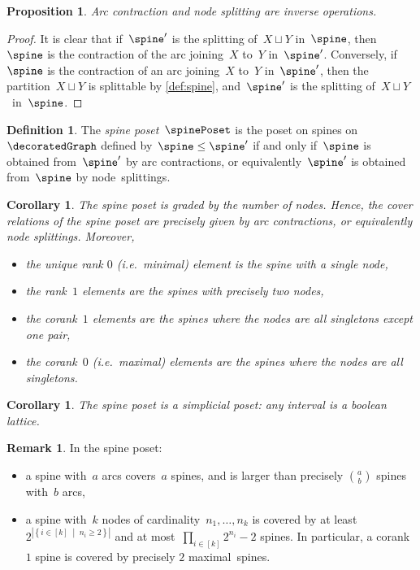 \documentclass{amsart}
\newtheorem{corollary}[theorem]{Corollary}
\newtheorem{proposition}[theorem]{Proposition}
\theoremstyle{definition}
\newtheorem{definition}[theorem]{Definition}
\newtheorem{remark}[theorem]{Remark}
\newcommand{\set}[2]{\left\{ #1 \;\middle|\; #2 \right\}} %
\newcommand{\ie}{\textit{i.e.}~} %
\newcommand{\darkblue}{\color{darkblue}} %
\newcommand{\defn}[1]{\textsl{\darkblue #1}} %
\newcommand{\vincent}[1]{\todo[color=blue!30]{#1 \\ \hfill --- V.}}
\begin{document}
\begin{proposition}
  \label{prop:contractionSplitting}
  Arc contraction and node splitting are inverse operations.
\end{proposition}

\begin{proof}
  It is clear that if~$\spine'$ is the splitting of~$X \sqcup Y$ in~$\spine$, then~$\spine$ is the contraction of the arc joining~$X$ to~$Y$ in~$\spine'$.
  Conversely, if~$\spine$ is the contraction of an arc joining~$X$ to~$Y$ in~$\spine'$, then the partition~$X \sqcup Y$ is splittable by \cref{def:spine}, and~$\spine'$ is the splitting of~$X \sqcup Y$~in~$\spine$.
\end{proof}

\begin{definition}
  \label{def:spinePoset}
  The \defn{spine poset}~$\spinePoset$ is the poset on spines on~$\decoratedGraph$ defined by~$\spine \le \spine'$ if and only if~$\spine$ is obtained from~$\spine'$ by arc contractions, or equivalently~$\spine'$ is obtained from~$\spine$ by node~splittings.
\end{definition}

\begin{corollary} 
  The spine poset is graded by the number of nodes.
  Hence, the cover relations of the spine poset are precisely given by arc contractions, or equivalently node splittings.
  Moreover,
  \begin{itemize}
    \item the unique rank $0$ (\ie minimal) element is the spine with a single node, 
    \item the rank~$1$ elements are the spines with precisely two nodes, 
    \item the corank~$1$ elements are the spines where the nodes are all singletons except one pair,
    \item the corank~$0$ (\ie maximal) elements are the spines where the nodes are all singletons.
  \end{itemize}
\end{corollary}

\begin{corollary}
  \label{coro:simplicialPoset}
  The spine poset is a simplicial poset: any interval is a boolean lattice.
  \vincent{todo}
\end{corollary}

\begin{remark}
  In the spine poset:
  \begin{itemize}
    \item a spine with~$a$ arcs covers~$a$ spines, and is larger than precisely $\binom{a}{b}$ spines with~$b$ arcs,
    \item a spine with~$k$ nodes of cardinality~$n_1, \dots, n_k$ is covered by at least~$2^{|\set{i \in [k]}{n_i \ge 2}|}$ and at most~$\prod_{i \in [k]} 2^{n_i}-2$ spines. In particular, a corank~$1$ spine is covered by precisely $2$ maximal~spines.
  \end{itemize}
\end{remark}
\end{document}
